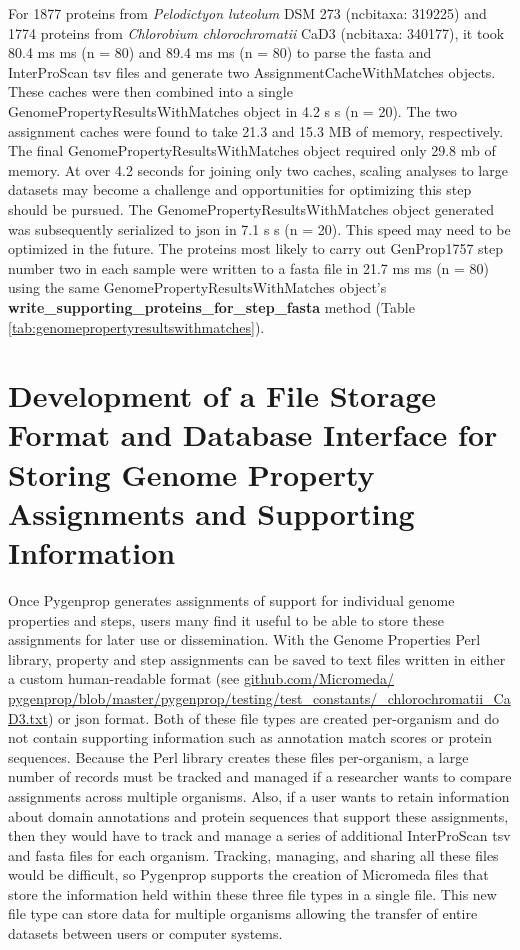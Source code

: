 For 1877 proteins from \textit{Pelodictyon luteolum} DSM 273 (\gls{ncbitaxa}: 
319225) and 1774 proteins from \textit{Chlorobium chlorochromatii} CaD3 
(\gls{ncbitaxa}: 340177), it took 80.4 ms  ms (\gls{n} = 80) and 89.4 
ms  ms (\gls{n} = 80) to parse the \gls{fasta} and InterProScan 
\gls{tsv} files and generate two AssignmentCacheWithMatches objects. These 
caches were then combined into a single GenomePropertyResultsWithMatches object 
in 4.2 s  s (\gls{n} = 20). The two assignment caches were found to 
take 21.3 and 15.3 MB of memory, respectively. The final 
GenomePropertyResultsWithMatches object required only 29.8 \gls{mb} of memory. 
At over 4.2 seconds for joining only two caches, scaling analyses to large 
datasets may become a challenge and opportunities for optimizing this step 
should be pursued. The GenomePropertyResultsWithMatches object generated was 
subsequently serialized to \gls{json} in 7.1 s  s (\gls{n} = 20). 
This speed may need to be optimized in the future. The proteins most likely to 
carry out GenProp1757 step number two in each sample were written to a 
\gls{fasta} file in 21.7 ms  ms (\gls{n} = 80) using the same 
GenomePropertyResultsWithMatches object's 
\textbf{write\_supporting\_proteins\_for\_step\_fasta} method (Table 
\ref{tab:genomepropertyresultswithmatches}).

\section{Development of a File Storage Format and Database Interface for Storing 
Genome Property Assignments and Supporting Information} \label{MicromedaFiles}

Once Pygenprop generates assignments of support for individual genome properties 
and steps, users many find it useful to be able to store these assignments for later 
use or dissemination. With the Genome Properties Perl library, property and step 
assignments can be saved to text files written in either a custom human-readable 
format (see 
\href{http://github.com/Micromeda/pygenprop/blob/master/pygenprop/testing/test_constants/C_chlorochromatii_CaD3.txt}{github.com/Micromeda/ 
pygenprop/blob/master/pygenprop/testing/test\_constants/\_chlorochromatii\_CaD3.txt}) 
or \gls{json} format. Both of these file types are created per-organism and do 
not contain supporting information such as annotation match scores or protein 
sequences. Because the Perl library creates these files per-organism, a large 
number of records must be tracked and managed if a researcher wants to compare 
assignments across multiple organisms. Also, if a user wants to retain 
information about domain annotations and protein sequences that support these 
assignments, then they would have to track and manage a series of additional 
InterProScan \gls{tsv} and \gls{fasta} files for each organism. Tracking, managing, 
and sharing all these files would be difficult, so Pygenprop supports the 
creation of Micromeda files that store the information held within these three 
file types in a single file. This new file type can store data for multiple 
organisms allowing the transfer of entire datasets between users or computer 
systems.

